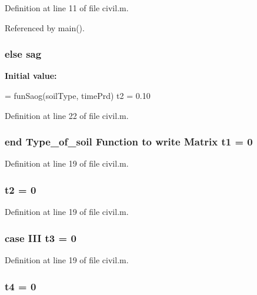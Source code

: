 Definition at line 11 of file civil.\-m.



Referenced by main().

\subsubsection[{sag}]{\setlength{\rightskip}{0pt plus 5cm}else sag}\label{civil_8m_aac9abc95cd2ddc27fa84fb4440b62888}
{\bfseries Initial value\-:}
\begin{DoxyCode}
= funSaog(soilType, timePrd)
  t2 = 0.10
\end{DoxyCode}


Definition at line 22 of file civil.\-m.

\subsubsection[{t1}]{\setlength{\rightskip}{0pt plus 5cm}end {\bf Type\-\_\-of\-\_\-soil} Function to write Matrix t1 = 0}\label{civil_8m_a3a318718cf4c9c1380475d059171d8f3}


Definition at line 19 of file civil.\-m.

\subsubsection[{t2}]{\setlength{\rightskip}{0pt plus 5cm}t2 = 0}\label{civil_8m_a24aeadb733f27244ec14e4cba82eeee9}


Definition at line 19 of file civil.\-m.

\subsubsection[{t3}]{\setlength{\rightskip}{0pt plus 5cm}case I\-I\-I t3 = 0}\label{civil_8m_a80d62394ff82e3ae283e9113bca340a2}


Definition at line 19 of file civil.\-m.

\subsubsection[{t4}]{\setlength{\rightskip}{0pt plus 5cm}t4 = 0}\label{civil_8m_ae95ab11d59379638967673bd74654b2a}


